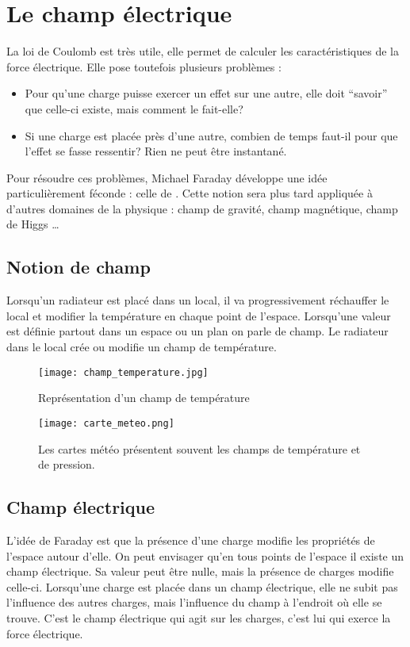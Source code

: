 \chapter{Le champ électrique}
La loi de Coulomb est très utile, elle permet de calculer les caractéristiques de la force électrique. Elle pose toutefois plusieurs problèmes :
\begin{itemize}[label=\textbullet]
    \item Pour qu'une charge puisse exercer un effet sur une autre, elle doit \enquote{savoir} que celle-ci existe, mais comment le fait-elle?
    \item Si une charge est placée près d'une autre, combien de temps faut-il pour que l'effet se fasse ressentir? Rien ne peut être instantané.
\end{itemize}

Pour résoudre ces problèmes, Michael Faraday développe une idée particulièrement féconde : celle de . Cette notion sera plus tard appliquée à d'autres domaines de la physique : champ de gravité, champ magnétique, champ de Higgs \ldots


\section{Notion de champ}
Lorsqu'un radiateur est placé dans un local, il va progressivement réchauffer le local et modifier la température en chaque point de l'espace.
Lorsqu'une valeur est définie partout dans un espace ou un plan on parle de champ. Le radiateur dans le local crée ou modifie un champ de température.


\begin{figure}[!ht]
    \centering
    \begin{minipage}[b]{.47\linewidth}
        \centering
        \texttt{[image: champ\_temperature.jpg]}
        \caption{Représentation d'un champ de température}
        \label{champ_temperature}
    \end{minipage}
    \begin{minipage}[b]{.47\linewidth}
        \centering
        \texttt{[image: carte\_meteo.png]}
        \caption{Les cartes météo présentent souvent les champs de température et de pression.}
        \label{carte_meteo}
    \end{minipage}
\end{figure}


\newpage

\section{Champ électrique}
L'idée de Faraday est que la présence d'une charge modifie les propriétés de l'espace autour d'elle. On peut envisager qu'en tous points de l'espace il existe un champ électrique. Sa valeur peut être nulle, mais la présence de charges modifie celle-ci.
Lorsqu'une charge est placée dans un champ électrique, elle ne subit pas l'influence des autres charges, mais l'influence du champ à l'endroit où elle se trouve. C'est le champ électrique qui agit sur les charges, c'est lui qui exerce la force électrique.

